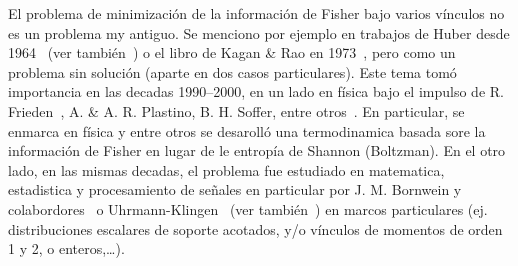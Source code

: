 El  problema  de  minimizaci\'on  de  la informaci\'on  de  Fisher  bajo  varios
v\'inculos no es un problema my antiguo.  Se menciono por ejemplo en trabajos de
Huber  desde  1964~\cite{Hub64}  (ver  tambi\'en~\cite{Hub92})  o  el  libro  de
Kagan \& Rao en 1973~\cite[Cp.~13 y p.~465]{KagLin73}, pero como un problema sin
soluci\'on (aparte en dos casos  particulares).  Este tema tom\'o importancia en
las  decadas  1990--2000,  en  un  lado  en  f\'isica  bajo  el  impulso  de  R.
Frieden~\cite{Fri89},  A.    \&  A.   R.    Plastino,  B.   H.    Soffer,  entre
otros~\cite{Fri89,  Fri90,  FriSof95,  FriPla99, FriPla02,  Fri98,  Fri04}.   En
particular,  se   enmarca  en  f\'isica   y  entre  otros  se   desaroll\'o  una
termodinamica basada sore  la informaci\'on de Fisher en lugar  de le entrop\'ia
de Shannon (Boltzman). En  el otro lado, en las mismas  decadas, el problema fue
estudiado en matematica, estadistica y  procesamiento de se\~nales en particular
por    J.    M.    Bornwein   y    colabordores~\cite{BorLew96,   BorLew95}    o
Uhrmann-Klingen~\cite{Uhr92,  Uhr95} (ver  tambi\'en~\cite{Ziv98, BerVig09})  en
marcos  particulares (ej.   distribuciones  escalares de  soporte acotados,  y/o
v\'inculos de momentos de orden 1 y 2, o enteros,\ldots).



